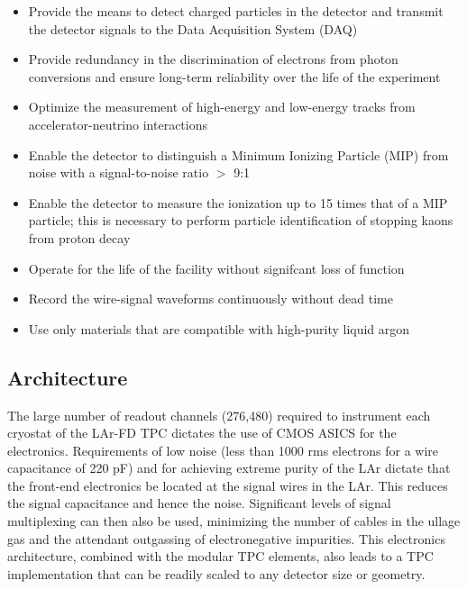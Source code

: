 \begin{itemize}	
\item Provide the means to detect charged particles in the detector and transmit the detector signals to the
Data Acquisition System (DAQ)
\item Provide redundancy in the discrimination of electrons from photon conversions and ensure long-term reliability
over the life of the experiment
\item Optimize the measurement of high-energy and low-energy tracks from accelerator-neutrino interactions
\item Enable the detector to distinguish a Minimum Ionizing Particle (MIP) from noise with a signal-to-noise ratio $>$ 9:1
\item Enable the detector to measure the ionization up to 15 times that of a MIP particle;
this is necessary to perform particle identification of stopping kaons from proton decay
\item Operate for the life of the facility without signifcant loss of function
\item Record the wire-signal waveforms continuously without dead time
\item Use only materials that are compatible with high-purity liquid argon

\end{itemize}



\subsection{Architecture}
\label{subsec:fe-arch}

The large number of readout channels (276,480) required to instrument
each cryostat of the LAr-FD TPC dictates the use of CMOS ASICS for the electronics. 
Requirements of low noise (less than 1000 rms electrons for a wire
capacitance of 220 pF) and for achieving extreme purity of the LAr dictate that
the front-end electronics be located at the signal wires in the LAr.  This
reduces the signal capacitance and hence the noise. Significant levels of 
signal multiplexing can then also be used, minimizing the number of cables
in the ullage gas and the attendant 
outgassing of electronegative impurities.
This electronics
architecture, combined with the modular TPC elements, also leads to a
TPC implementation that can be readily scaled to any detector size or
geometry.


